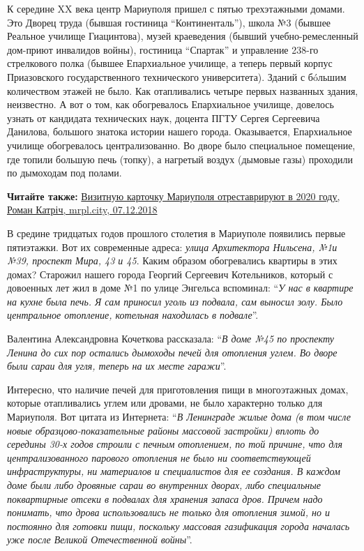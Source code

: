 К середине XX века центр Мариуполя пришел с пятью трехэтажными домами. Это
Дворец труда (бывшая гостиница \enquote{Континенталь}), школа №3 (бывшее Реальное
училище Гиацинтова), музей краеведения (бывший учебно-ремесленный дом-приют
инвалидов войны), гостиница \enquote{Спартак} и управление 238-го стрелкового полка
(бывшее Епархиальное училище, а теперь первый корпус Приазовского
государственного технического университета). Зданий с бóльшим количеством
этажей не было. Как отапливались четыре первых названных здания, неизвестно. А
вот о том, как обогревалось Епархиальное училище, довелось узнать от кандидата
технических наук, доцента ПГТУ Сергея Сергеевича Данилова, большого знатока
истории нашего города. Оказывается, Епархиальное училище обогревалось
централизованно. Во дворе было специальное помещение, где топили большую печь
(топку), а нагретый воздух (дымовые газы) проходили по дымоходам под полами.

\textbf{Читайте также:} \href{https://mrpl.city/news/view/vizitnuyu-kartochku-mariupolya-otrestavriruyut-v-2020-godu-foto}{%
Визитную карточку Мариуполя отреставрируют в 2020 году, Роман Катріч, mrpl.city, 07.12.2018}

В средине тридцатых годов прошлого столетия в Мариуполе появились первые
пятиэтажки. Вот их современные адреса: \emph{улица Архитектора Нильсена, №1и №39,
проспект Мира, 43 и 45}. Каким образом обогревались квартиры в этих домах?
Старожил нашего города Георгий Сергеевич Котельников, который с довоенных лет
жил в доме №1 по улице Энгельса вспоминал: \enquote{\em У нас в квартире на кухне была
печь. Я сам приносил уголь из подвала, сам выносил золу. Было центральное
отопление, котельная находилась в подвале}.

Валентина Александровна Кочеткова рассказала: \enquote{\em В доме №45 по проспекту Ленина
до сих пор остались дымоходы печей для отопления углем. Во дворе были сараи для
угля, теперь на их месте гаражи}.

Интересно, что наличие печей для приготовления пищи в многоэтажных домах,
которые отапливались углем или дровами, не было характерно только для
Мариуполя. Вот цитата из Интернета: \enquote{\em В Ленинграде жилые дома (в том числе новые
образцово-показательные районы массовой застройки) вплоть до середины 30-х
годов строили с печным отоплением, по той причине, что для централизованного
парового отопления не было ни соответствующей инфраструктуры, ни материалов и
специалистов для ее создания. В каждом доме были либо дровяные сараи во
внутренних дворах, либо специальные поквартирные отсеки в подвалах для хранения
запаса дров. Причем надо понимать, что дрова использовались не только для
отопления зимой, но и постоянно для готовки пищи, поскольку массовая
газификация города началась уже после Великой Отечественной войны}. 

